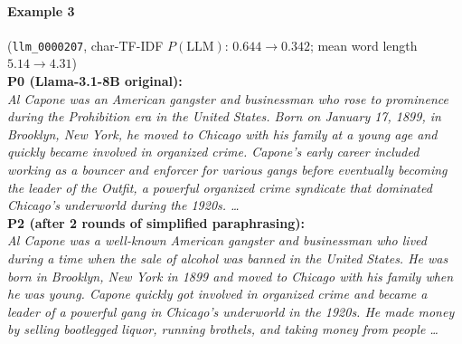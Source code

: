 \paragraph{Example 3} (\texttt{llm_0000207}, char-TF-IDF $P(\mathrm{LLM})$: $\mathbf{0.644}\to\mathbf{0.342}$; mean word length $\mathbf{5.14}\to\mathbf{4.31}$)\\
\noindent\textbf{P0 (Llama-3.1-8B original):}\\
\emph{Al Capone was an American gangster and businessman who rose to prominence during the Prohibition era in the United States. Born on January 17, 1899, in Brooklyn, New York, he moved to Chicago with his family at a young age and quickly became involved in organized crime. Capone's early career included working as a bouncer and enforcer for various gangs before eventually becoming the leader of the Outfit, a powerful organized crime syndicate that dominated Chicago's underworld during the 1920s. \ldots}\\[0.3em]
\noindent\textbf{P2 (after 2 rounds of simplified paraphrasing):}\\
\emph{Al Capone was a well-known American gangster and businessman who lived during a time when the sale of alcohol was banned in the United States. He was born in Brooklyn, New York in 1899 and moved to Chicago with his family when he was young. Capone quickly got involved in organized crime and became a leader of a powerful gang in Chicago's underworld in the 1920s. He made money by selling bootlegged liquor, running brothels, and taking money from people \ldots}\\[0.7em]

